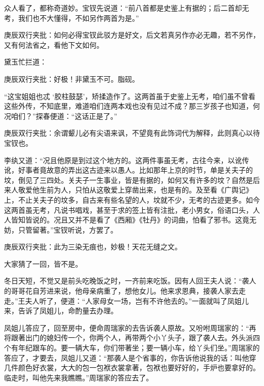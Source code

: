 \begin{parag}
    众人看了，都称奇道妙。宝钗先说道：“前八首都是史鉴上有据的；后二首却无考，我们也不大懂得，不如另作两首为是。”\begin{note}庚辰双行夹批：如何必得宝钗此驳方是好文，后文若真另作亦必无趣，若不另作，又有何法省之，看他下文如何。\end{note}黛玉忙拦道：\begin{note}庚辰双行夹批：好极！非黛玉不可。脂砚。\end{note}“这宝姐姐也忒 ‘胶柱鼓瑟’，矫揉造作了。这两首虽于史鉴上无考，咱们虽不曾看这些外传，不知底里，难道咱们连两本戏也没有见过不成？那三岁孩子也知道，何况咱们？”探春便道：“这话正是了。”\begin{note}庚辰双行夹批：余谓颦儿必有尖语来讽，不望竟有此饰词代为解释，此则真心以待宝钗也。\end{note}李纨又道：“况且他原是到过这个地方的。这两件事虽无考，古往今来，以讹传讹，好事者竟故意的弄出这古迹来以愚人。比如那年上京的时节，单是关夫子的坟，倒见了三四处。关夫子一生事业，皆是有据的，如何又有许多的坟？自然是后来人敬爱他生前为人，只怕从这敬爱上穿凿出来，也是有的。及至看《广舆记》上，不止关夫子的坟多，自古来有些名望的人，坟就不少，无考的古迹更多。如今这两首虽无考，凡说书唱戏，甚至于求的签上皆有注批，老小男女，俗语口头，人人皆知皆说的。况且又并不是看了《西厢》《牡丹》的词曲，怕看了邪书。这竟无妨，只管留著。”宝钗听说，方罢了。\begin{note}庚辰双行夹批：此为三染无痕也，妙极！天花无缝之文。\end{note}大家猜了一回，皆不是。
\end{parag}


\begin{parag}
    冬日天短，不觉又是前头吃晚饭之时，一齐前来吃饭。因有人回王夫人说：“袭人的哥哥花自芳进来说，他母亲病重了，想他女儿。他来求恩典，接袭人家去走走。”王夫人听了，便道：“人家母女一场，岂有不许他去的。”一面就叫了凤姐儿来，告诉了凤姐儿，命酌量去办理。
\end{parag}


\begin{parag}
    凤姐儿答应了，回至房中，便命周瑞家的去告诉袭人原故。又吩咐周瑞家的：“再将跟著出门的媳妇传一个，你两个人，再带两个小丫头子，跟了袭人去。外头派四个有年纪跟车的。要一辆大车，你们带著坐；要一辆小车，给丫头们坐。”周瑞家的答应了，才要去，凤姐儿又道：“那袭人是个省事的，你告诉他说我的话：叫他穿几件颜色好衣裳，大大的包一包袱衣裳拿著，包袱也要好好的，手炉也要拿好的。临走时，叫他先来我瞧瞧。”周瑞家的答应去了。
\end{parag}


